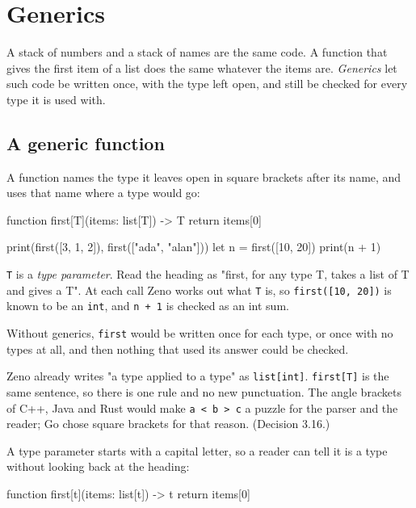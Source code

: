 \chapter{Generics}\label{ch-generics}

A stack of numbers and a stack of names are the same code. A function
that gives the first item of a list does the same whatever the items
are. \emph{Generics} let such code be written once, with the type left
open, and still be checked for every type it is used with.

\section{A generic function}

A function names the type it leaves open in square brackets after its
name, and uses that name where a type would go:

\begin{zeno}
function first[T](items: list[T]) -> T {
    return items[0]
}

print(first([3, 1, 2]), first(["ada", "alan"]))
let n = first([10, 20])
print(n + 1)
\end{zeno}

\verb|T| is a \emph{type parameter}. Read the heading as "first, for
any type T, takes a list of T and gives a T". At each call Zeno works
out what \verb|T| is, so \verb|first([10, 20])| is known to be an
\verb|int|, and \verb|n + 1| is checked as an int sum.

Without generics, \verb|first| would be written once for each type, or
once with no types at all, and then nothing that used its answer could
be checked.

\begin{why}
Zeno already writes "a type applied to a type" as \verb|list[int]|.
\verb|first[T]| is the same sentence, so there is one rule and no new
punctuation. The angle brackets of C++, Java and Rust would make
\verb|a < b > c| a puzzle for the parser and the reader; Go chose
square brackets for that reason. (Decision 3.16.)
\end{why}

A type parameter starts with a capital letter, so a reader can tell it
is a type without looking back at the heading:

\begin{zeno}[fails=yes]
function first[t](items: list[t]) -> t {
    return items[0]
}
\end{zeno}

